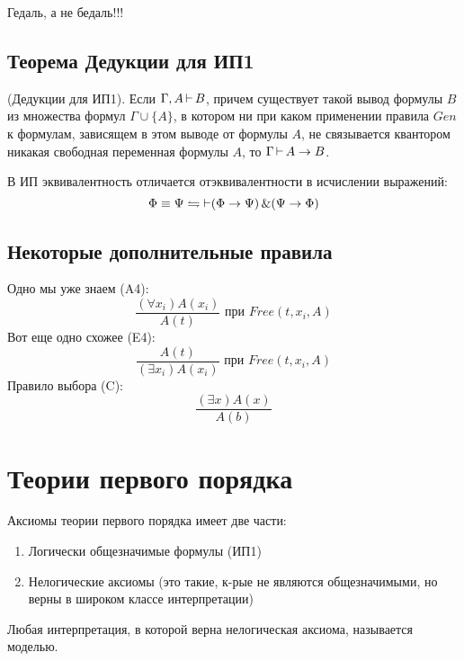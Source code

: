 

\title{}
\author{Козырнов Александр Дмитриевич, ИУ7-32Б}
\date{\today}


Гедаль, а не бедаль!!!

\subsection{Теорема Дедукции для ИП1}

\begin{theorem}
    (Дедукции для ИП1). Если $\Gamma, A\operatorname{\vdash} B$, причем существует такой вывод формулы  $B$ из
    множества формул  $\Gamma \cup \{A\} $, в котором ни при каком применении правила
    $Gen$ к формулам, зависящем в этом
    выводе от формулы  $A$, не связывается квантором никакая свободная переменная формулы  $A$,
    то  $\Gamma \operatorname{\vdash} A \to B$.
\end{theorem}


В ИП эквивалентность отличается отэквивалентности в исчислении выражений:
$$\Phi \equiv \Psi \leftrightharpoons \operatorname{\vdash}(\Phi \to \Psi)\operatorname{\&}(\Psi\to \Phi)$$

\subsection{Некоторые дополнительные правила}

Одно мы уже знаем (A4):
\[
    \frac{(\forall x_{i})A(x_{i})}{A(t)} \text{ при } Free(t,x_{i},A)
\] 
Вот еще одно схожее (E4):
\[
    \frac{A(t)}{(\exists x_{i})A(x_{i})} \text{ при } Free(t,x_{i},A)
\] 
Правило выбора (C):
\[
\frac{(\exists x)A(x)}{A(b)}
\] 

\section{Теории первого порядка}

Аксиомы теории первого порядка имеет две части:
\begin{enumerate}
    \item Логически общезначимые формулы (ИП1)
    \item Нелогические аксиомы (это такие, к-рые не являются общезначимыми, но верны в широком классе
        интерпретации)
\end{enumerate}

\begin{definition}
Любая интерпретация, в которой верна нелогическая аксиома, называется моделью.
\end{definition}



